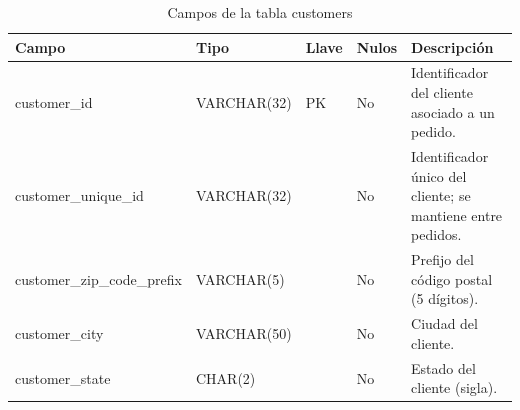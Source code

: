 \documentclass[a4paper,stu,12pt,donotrepeattitle,floatsintext]{apa7}
\begin{document}
{\footnotesize
\begin{longtable}{|>{\raggedright\arraybackslash}p{}|>{\raggedright\arraybackslash}p{}|>{\raggedright\arraybackslash}p{}|>{\raggedright\arraybackslash}p{}|>{\raggedright\arraybackslash}p{}|}
\caption{Campos de la tabla customers}\\
\hline
\textbf{Campo} & \textbf{Tipo} & \textbf{Llave} & \textbf{Nulos} & \textbf{Descripción} \\ \hline
\endhead
customer\_\allowbreak{}id & VARCHAR(32) & PK & No & Identificador del cliente asociado a un pedido. \\ \hline
customer\_\allowbreak{}unique\_\allowbreak{}id & VARCHAR(32) &  & No & Identificador único del cliente; se mantiene entre pedidos. \\ \hline
customer\_\allowbreak{}zip\_\allowbreak{}code\_\allowbreak{}prefix & VARCHAR(5) &  & No & Prefijo del código postal (5 dígitos). \\ \hline
customer\_\allowbreak{}city & VARCHAR(50) &  & No & Ciudad del cliente. \\ \hline
customer\_\allowbreak{}state & CHAR(2) &  & No & Estado del cliente (sigla). \\ \hline
\end{longtable}
}
\end{document}
